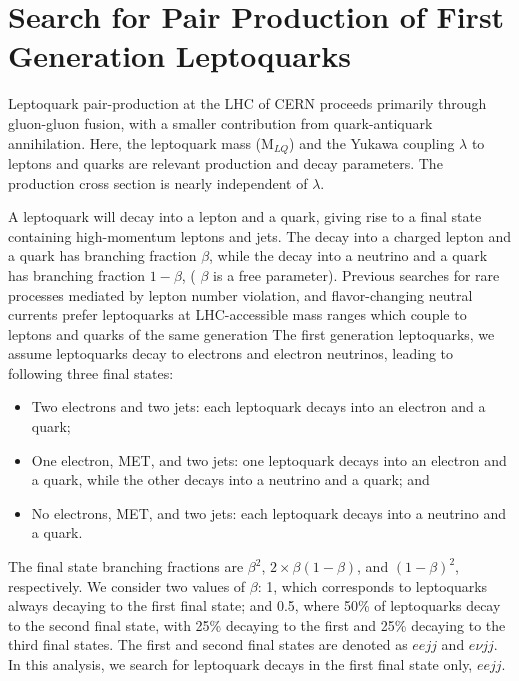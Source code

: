 \chapter{Search for Pair Production of First Generation Leptoquarks  \label{Search for pair Production of First Generation Lepto Quarks}}


Leptoquark pair-production at the LHC of CERN proceeds primarily through gluon-gluon fusion, with a smaller contribution from quark-antiquark annihilation.
Here, the leptoquark mass (M$_{LQ}$) and the Yukawa coupling $\lambda$ to leptons and quarks are relevant production and decay parameters.
The production cross section is nearly independent of $\lambda$.

A leptoquark will decay into a lepton and a quark, giving rise to a final state containing high-momentum leptons and jets.
The decay into a charged lepton and a quark has branching fraction $\beta$, while the decay into a neutrino and a quark has branching fraction $1-\beta$, ( $\beta$ is a free parameter). Previous searches for rare processes mediated by lepton number violation, and flavor-changing neutral currents prefer leptoquarks at LHC-accessible mass ranges which couple to leptons and quarks of
  the same generation %
The first generation leptoquarks, we assume leptoquarks decay to electrons and electron neutrinos, leading to following three final states:
\begin{itemize}
  \item Two electrons and two jets: each leptoquark decays into an electron and a quark;
  \item One electron, MET, and two jets: one leptoquark decays into an electron and a quark, while the other decays into a neutrino and a quark; and 
  \item No electrons, MET, and two jets: each leptoquark decays into a neutrino and a quark.
\end{itemize}
The final state branching fractions are $\beta^2$, $2\times\beta(1-\beta)$, and $(1-\beta)^2$, respectively.
We consider two values of $\beta$: 1, which corresponds to leptoquarks always decaying to the first final state; and 0.5,
where 50\% of leptoquarks decay to the second final state, with 25\% decaying to the first and 25\% decaying to the third final states.
The first and second final states are denoted as $eejj$ and $e{\nu}jj$.
In this analysis, we search for leptoquark decays in the first final state only, $eejj$.

